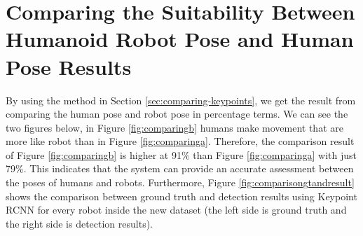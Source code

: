 \section{Comparing the Suitability Between Humanoid Robot Pose and Human Pose Results}
\label{sec:comparingsuitabilityresults}

By using the method in Section \ref{sec:comparing-keypoints}, we get the result from comparing the human pose and robot pose in percentage terms.
We can see the two figures below, in Figure \ref{fig:comparingb} humans make movement that are more like robot than in Figure \ref{fig:comparinga}.
Therefore, the comparison result of Figure \ref{fig:comparingb} is higher at 91\% than Figure \ref{fig:comparinga} with just 79\%.
This indicates that the system can provide an accurate assessment between the poses of humans and robots.
Furthermore, Figure \ref{fig:comparisongtandresult} shows the comparison between ground truth and detection results using Keypoint RCNN for every robot inside the new dataset
(the left side is ground truth and the right side is detection results).

